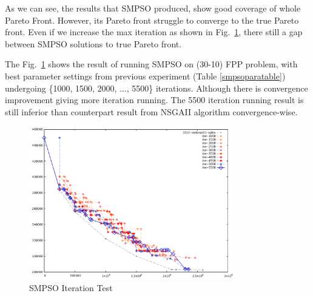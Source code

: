 \documentclass[10pt,journal,compsoc]{IEEEtran}
\newcommand{\Fig}[1]{Fig.~\ref{#1}}
\begin{document}
\begin{table}[H]
\caption{SMPSO Parameter Selection}
\label{smpsoparatable}
\centering
{}
\end{table}

As we can see, the results that SMPSO produced, show good coverage of whole Pareto Front. However, its Pareto front struggle to converge to the true Pareto front. Even if we increase the max iteration as shown in \Fig{smpsoitertest}, there still a gap between SMPSO solutions to true Pareto front. 

The \Fig{smpsoitertest} shows the result of running SMPSO on (30-10) FPP problem, with best parameter settings from previous experiment (Table \ref{smpsoparatable}) undergoing \{1000, 1500, 2000, ..., 5500\} iterations. Although there is convergence improvement giving more iteration running. The 5500 iteration running result is still inferior than counterpart result from NSGAII algorithm convergence-wise.


\begin{figure}[H]
\centerline{\includegraphics[page=1,width=3.5in]{SMPSO_iterationtest.pdf}}
\caption{SMPSO Iteration Test} 
\label{smpsoitertest}
\end{figure}
\end{document}
